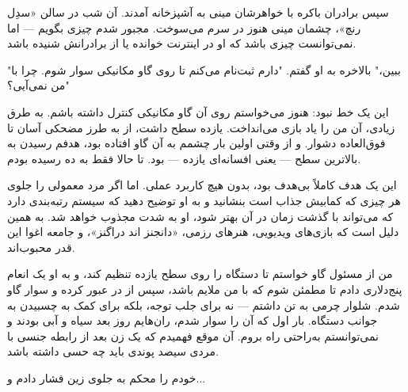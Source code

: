 سپس برادران باکره با خواهرشان مینی به آشپزخانه آمدند. آن شب در سالن «سدِل رنچ»، چشمان مینی هنوز در سرم می‌سوخت. مجبور شدم چیزی بگویم — اما نمی‌توانست چیزی باشد که او در اینترنت خوانده یا از برادرانش شنیده باشد.

"ببین،" بالاخره به او گفتم. "دارم ثبت‌نام می‌کنم تا روی گاو مکانیکی سوار شوم. چرا با من نمی‌آیی؟"

این یک خط نبود: هنوز می‌خواستم روی آن گاو مکانیکی کنترل داشته باشم. به طرق زیادی، آن من را یاد بازی می‌انداخت. یازده سطح داشت، از به طرز مضحکی آسان تا فوق‌العاده دشوار. و از وقتی اولین بار چشمم به آن گاو افتاده بود، هدفم رسیدن به بالاترین سطح — یعنی افسانه‌ای یازده — بود. تا حالا فقط به ده رسیده بودم.

این یک هدف کاملاً بی‌هدف بود، بدون هیچ کاربرد عملی. اما اگر مرد معمولی را جلوی هر چیزی که کمابیش جذاب است بنشانید و به او توضیح دهید که سیستم رتبه‌بندی دارد که می‌تواند با گذشت زمان در آن بهتر شود، او به شدت مجذوب خواهد شد. به همین دلیل است که بازی‌های ویدیویی، هنرهای رزمی، «دانجنز اند دراگنز»، و جامعه اغوا این قدر محبوب‌اند.

من از مسئول گاو خواستم تا دستگاه را روی سطح یازده تنظیم کند، و به او یک انعام پنج‌دلاری دادم تا مطمئن شوم که با من ملایم باشد، سپس از در عبور کرده و سوار گاو شدم. شلوار چرمی به تن داشتم — نه برای جلب توجه، بلکه برای کمک به چسبیدن به جوانب دستگاه. بار اول که آن را سوار شدم، ران‌هایم روز بعد سیاه و آبی بودند و نمی‌توانستم به‌راحتی راه بروم. آن موقع فهمیدم که یک زن بعد از رابطه جنسی با مردی سیصد پوندی باید چه حسی داشته باشد. 

خودم را محکم به جلوی زین فشار دادم و...